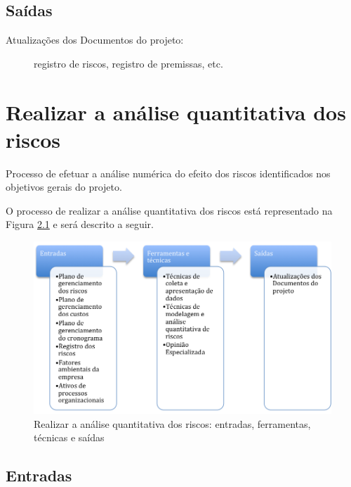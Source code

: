 \section{Saídas}

\begin{description}
	
	\item[Atualizações dos Documentos do projeto:] registro de riscos, registro de premissas, etc.
	
\end{description}

\chapter{Realizar a análise quantitativa dos riscos}

Processo de efetuar a análise numérica do efeito dos riscos identificados nos objetivos gerais do projeto.

O processo de realizar a análise quantitativa dos riscos está representado na Figura \ref{fig:riscos:analise:quant:efts} e será descrito a seguir.

\begin{figure}[!h]
	\centering
	\includegraphics[scale=0.5]{Figuras/riscos_efts_analise_quant.png}
	\caption{Realizar a análise quantitativa dos riscos: entradas, ferramentas, técnicas e saídas}
	\label{fig:riscos:analise:quant:efts}
\end{figure}

\section{Entradas}

